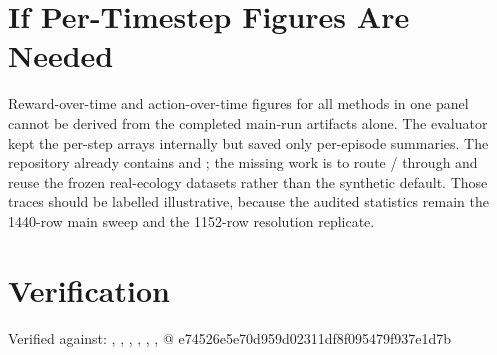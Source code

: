\documentclass[11pt]{article}
\begin{document}
\section{If Per-Timestep Figures Are Needed}

Reward-over-time and action-over-time figures for all methods in one panel
cannot be derived from the completed main-run artifacts alone. The evaluator
kept the per-step arrays internally but saved only per-episode summaries. The
repository already contains  and
; the missing work is to route
/ through  and reuse
the frozen real-ecology datasets rather than the synthetic default. Those
traces should be labelled illustrative, because the audited statistics remain
the 1440-row main sweep and the 1152-row resolution replicate.

\section*{Verification}

Verified against: , , , , , ,  @ e74526e5e70d959d02311df8f095479f937e1d7b
\end{document}
